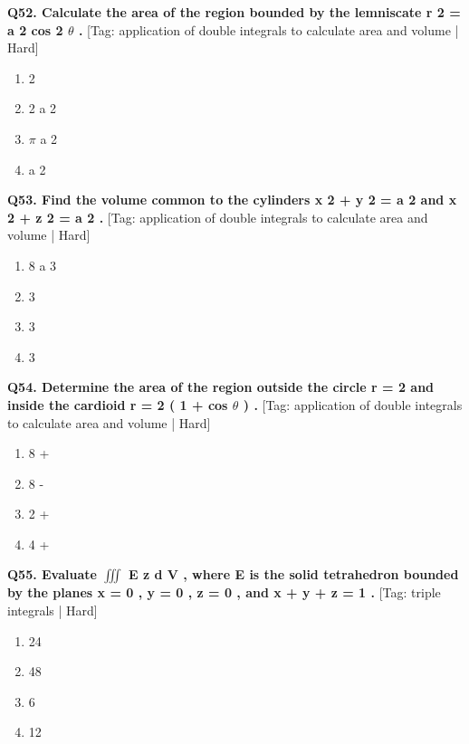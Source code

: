 \noindent\textbf{Q52. Calculate the area of the region bounded by the lemniscate r 2 = a 2 cos 2 $\theta$ .} \hfill [Tag: application of double integrals to calculate area and volume | Hard]
\begin{enumerate}[label=(\alph*),topsep=2pt,itemsep=1pt,partopsep=0pt,parsep=0pt]
    \item {{2}}
    \item {{2 a 2}}
    \item {{$\pi$ a 2}}
    \item {{a 2}}
\end{enumerate}
\vspace{2mm}

\noindent\textbf{Q53. Find the volume common to the cylinders x 2 + y 2 = a 2 and x 2 + z 2 = a 2 .} \hfill [Tag: application of double integrals to calculate area and volume | Hard]
\begin{enumerate}[label=(\alph*),topsep=2pt,itemsep=1pt,partopsep=0pt,parsep=0pt]
    \item {{8 a 3}}
    \item {{3}}
    \item {{3}}
    \item {{3}}
\end{enumerate}
\vspace{2mm}

\noindent\textbf{Q54. Determine the area of the region outside the circle r = 2 and inside the cardioid r = 2 ( 1 + cos $\theta$ ) .} \hfill [Tag: application of double integrals to calculate area and volume | Hard]
\begin{enumerate}[label=(\alph*),topsep=2pt,itemsep=1pt,partopsep=0pt,parsep=0pt]
    \item {{8 +}}
    \item {{8 -}}
    \item {{2 +}}
    \item {{4 +}}
\end{enumerate}
\vspace{2mm}

\noindent\textbf{Q55. Evaluate $\iiint$ E z d V , where E is the solid tetrahedron bounded by the planes x = 0 , y = 0 , z = 0 , and x + y + z = 1 .} \hfill [Tag: triple integrals | Hard]
\begin{enumerate}[label=(\alph*),topsep=2pt,itemsep=1pt,partopsep=0pt,parsep=0pt]
    \item {{24}}
    \item {{48}}
    \item {{6}}
    \item {{12}}
\end{enumerate}
\vspace{2mm}

